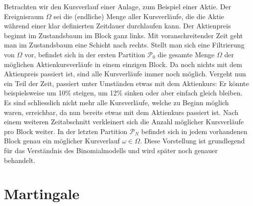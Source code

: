 \documentclass[11pt]{report} %
\begin{document}
Betrachten wir den Kursverlauf einer Anlage, zum Beispiel einer Aktie. Der Ereignisraum $\Omega$ sei die (endliche) Menge aller Kursverläufe, die die Aktie während einer klar definierten Zeitdauer durchlaufen kann. Der Aktienpreis beginnt im Zustandsbaum im Block ganz links. Mit voranschreitender Zeit geht man im Zustandsbaum eine Schicht nach rechts. Stellt man sich eine Filtrierung von $\Omega$ vor, befindet sich in der ersten Partition $\mathcal{P}_0$ die gesamte Menge $\Omega$ der möglichen Aktienkursverläufe in einem einzigen Block. Da noch nichts mit dem Aktienpreis passiert ist, sind alle Kursverläufe immer noch möglich. Vergeht nun ein Teil der Zeit, passiert unter Umständen etwas mit dem Aktienkurs: Er könnte beispielsweise um 10\% steigen, um 12\% sinken oder aber einfach gleich bleiben. Es sind schliesslich nicht 
mehr alle Kursverläufe, welche zu Beginn möglich waren, erreichbar, da nun bereits etwas mit dem Aktienkurs passiert ist. Nach einem weiteren Zeitabschnitt verkleinert sich die Anzahl möglicher Kursverläufe pro Block weiter. In der letzten Partition $\mathcal{P}_N$ befindet sich in jedem vorhandenen Block genau ein möglicher Kursverlauf $\omega \in \Omega$. Diese Vorstellung ist grundlegend für das Verständnis des Binomialmodells und wird später noch genauer behandelt.

\section{Martingale}
\end{document}
